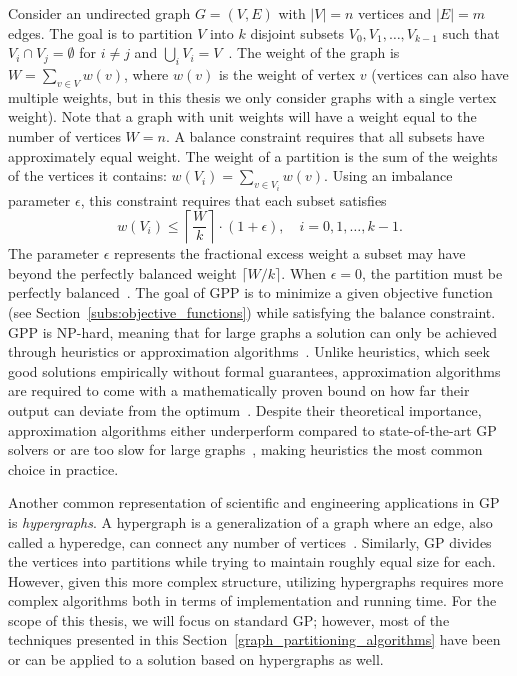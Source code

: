 Consider an undirected graph $G = (V, E)$ with $|V| = n$ vertices and $|E| = m$ edges. The goal is to partition $V$ into $k$ disjoint subsets $V_0, V_1, \ldots, V_{k-1}$ such that $V_i \cap V_j = \emptyset$ for $i \neq j$ and $\bigcup_iV_i=V$~\cite{karypis_multilevelk-way_1998}. The weight of the graph is $W = \sum_{v \in V}w(v)$, where $w(v)$ is the weight of vertex $v$ (vertices can also have multiple weights, but in this thesis we only consider graphs with a single vertex weight). Note that a graph with unit weights will have a weight equal to the number of vertices $W = n$. A balance constraint requires that all subsets have approximately equal weight. The weight of a partition is the sum of the weights of the vertices it contains: $w(V_i) = \sum_{v\in V_i} w(v)$. Using an imbalance parameter $\epsilon$, this constraint requires that each subset satisfies
\[
	w(V_i) \leq \left\lceil \frac{W}{k} \right\rceil \cdot (1 + \epsilon),\quad i= 0,1,\dots,k-1.
\]
The parameter $\epsilon$ represents the fractional excess weight a subset may have beyond the perfectly balanced weight $\lceil W/k \rceil$. When $\epsilon = 0$, the partition must be perfectly balanced~\cite{buluc_recent_2016}. The goal of GPP is to minimize a given objective function (see Section~\ref{subs:objective_functions}) while satisfying the balance constraint. GPP is NP-hard, meaning that for large graphs a solution can only be achieved through heuristics or approximation algorithms~\cite{garey_simplified_1976}. Unlike heuristics, which seek good solutions empirically without formal guarantees, approximation algorithms are required to come with a mathematically proven bound on how far their output can deviate from the optimum~\cite{Williamson_Shmoys_2011}. Despite their theoretical importance, approximation algorithms either underperform compared to state-of-the-art GP solvers or are too slow for large graphs~\cite{buluc_recent_2016}, making heuristics the most common choice in practice. 

Another common representation of scientific and engineering applications in GP is \textit{hypergraphs}. A hypergraph is a generalization of a graph where an edge, also called a hyperedge, can connect any number of vertices~\cite{buluc_graph_2013}. Similarly, GP divides the vertices into partitions while trying to maintain roughly equal size for each. However, given this more complex structure, utilizing hypergraphs requires more complex algorithms both in terms of implementation and running time. For the scope of this thesis, we will focus on standard GP; however, most of the techniques presented in this Section~\ref{graph_partitioning_algorithms} have been or can be applied to a solution based on hypergraphs as well.

